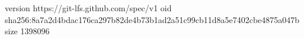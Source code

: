 version https://git-lfs.github.com/spec/v1
oid sha256:8a7a2d4bdac176ca297b82de4b73b1ad2a51c99cb11d8a5e7402cbe4875a047b
size 1398096
